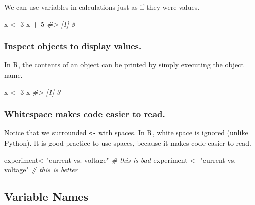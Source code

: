 \documentclass[
]{book}
\newenvironment{Shaded}{\begin{snugshade}}{\end{snugshade}}
\newcommand{\CommentTok}[1]{\textcolor[rgb]{0.56,0.35,0.01}{\textit{#1}}}
\newcommand{\DecValTok}[1]{\textcolor[rgb]{0.00,0.00,0.81}{#1}}
\newcommand{\NormalTok}[1]{#1}
\newcommand{\OperatorTok}[1]{\textcolor[rgb]{0.81,0.36,0.00}{\textbf{#1}}}
\newcommand{\StringTok}[1]{\textcolor[rgb]{0.31,0.60,0.02}{#1}}
\begin{document}
We can use variables in calculations just as if they were values.

\begin{Shaded}
\begin{Highlighting}[]
\NormalTok{x <-}\StringTok{ }\DecValTok{3}
\NormalTok{x }\OperatorTok{+}\StringTok{ }\DecValTok{5}
\CommentTok{#> [1] 8}
\end{Highlighting}
\end{Shaded}

\hypertarget{inspect-objects-to-display-values.}{%
\subsubsection*{Inspect objects to display values.}\label{inspect-objects-to-display-values.}}

In R, the contents of an object can be printed by simply executing the object name.

\begin{Shaded}
\begin{Highlighting}[]
\NormalTok{x <-}\StringTok{ }\DecValTok{3}
\NormalTok{x}
\CommentTok{#> [1] 3}
\end{Highlighting}
\end{Shaded}

\hypertarget{whitespace-makes-code-easier-to-read.}{%
\subsubsection*{Whitespace makes code easier to read.}\label{whitespace-makes-code-easier-to-read.}}

Notice that we surrounded \texttt{\textless{}-} with spaces. In R, white space is ignored (unlike Python). It is good practice to use spaces, because it makes code easier to read.

\begin{Shaded}
\begin{Highlighting}[]
\NormalTok{experiment<-}\StringTok{"current vs. voltage"}   \CommentTok{# this is bad}
\NormalTok{experiment <-}\StringTok{ "current vs. voltage"} \CommentTok{# this is better}
\end{Highlighting}
\end{Shaded}

\hypertarget{variable-names}{%
\subsection{Variable Names}\label{variable-names}}
\end{document}
